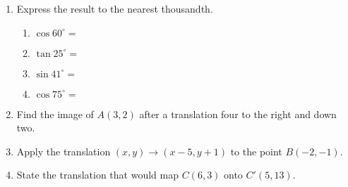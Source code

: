 \documentclass[12pt, twoside]{article}
\begin{document}
\begin{enumerate}
    \begin{multicols}{2}
      \underline{Statement} \\
      \underline{Reason}
    \end{multicols}
    \begin{multicols}{2}
      \raggedcolumns
      \begin{enumerate}[label={\arabic*)}]
        \item $\triangle ABC$, $\triangle JKP$
        \item \rule{4cm}{0.15mm}%
        \item $\angle APB \cong \angle JPK$ %

        \item $\triangle ABP \cong \triangle JKP$
      \end{enumerate}
      \begin{enumerate}[label={\arabic*)}]
        \item Given
        \item Given
        \item \rule{4cm}{0.15mm}
        \item \rule{4cm}{0.15mm}
      \end{enumerate}
    \end{multicols}

  \item Express the result to the nearest thousandth.  \vspace{1cm}

    \begin{multicols}{2}
      \begin{enumerate}
        \item $\cos 60^\circ = $ \vspace{1cm}
        \item $\tan 25^\circ =$
        \item $\sin 41^\circ = $ \vspace{1cm}
        \item $\cos 75^\circ =$

      \end{enumerate}
    \end{multicols} \vspace{1cm}

  \item Find the image of $A(3,2)$ after a translation four to the right and down two. \vspace{1cm}
  \item Apply the translation $(x,y) \rightarrow (x-5,y+1)$ to the point $B(-2,-1)$. \vspace{1cm}
  \item State the translation that would map $C(6,3)$ onto $C'(5,13)$.



\end{enumerate}
\end{document}
